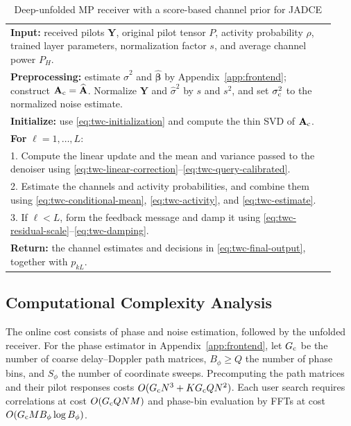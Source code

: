 \begin{table}[t]
\centering
\caption{Deep-unfolded MP receiver with a score-based channel prior for JADCE}
\label{tab:twc-algorithm}
\begin{tabular}{p{0.93\linewidth}}
\toprule
\textbf{Input:} received pilots $\mathbf Y$, original pilot tensor $P$,
activity probability $\rho$, trained layer parameters, normalization
factor $s$, and average channel power $P_H$.\\
\textbf{Preprocessing:} estimate $\widehat\sigma^2$ and
$\widehat{\bm\beta}$ by Appendix~\ref{app:frontend}; construct
$\mathbf A_{\rm c}=\widehat{\mathbf A}$.
Normalize $\mathbf Y$ and $\widehat\sigma^2$ by $s$ and $s^2$,
and set $\sigma_{\rm c}^2$ to the normalized noise estimate.\\
\textbf{Initialize:} use \eqref{eq:twc-initialization} and compute
the thin SVD of $\mathbf A_{\rm c}$.\\
\textbf{For} $\ell=1,\ldots,L$:\\
1. Compute the linear update and the mean and variance passed to the denoiser using
\eqref{eq:twc-linear-correction}--\eqref{eq:twc-query-calibrated}.\\
2. Estimate the channels and activity probabilities, and combine
them using \eqref{eq:twc-conditional-mean}, \eqref{eq:twc-activity},
and \eqref{eq:twc-estimate}.\\
3. If $\ell<L$, form the feedback message and damp it using
\eqref{eq:twc-residual-scale}--\eqref{eq:twc-damping}.\\
\textbf{Return:} the channel estimates and decisions in
\eqref{eq:twc-final-output}, together with $p_{kL}$.\\
\bottomrule
\end{tabular}
\end{table}

\subsection{Computational Complexity Analysis}

The online cost consists of phase and noise estimation, followed by
the unfolded receiver. For the phase estimator in
Appendix~\ref{app:frontend}, let $G_{\rm c}$ be the number of coarse
delay--Doppler path matrices, $B_\phi\geq Q$ the number of phase bins,
and $S_\phi$ the number of coordinate sweeps. Precomputing the path
matrices and their pilot responses costs
$O(G_{\rm c}N^3+KG_{\rm c}QN^2)$.
Each user search requires correlations at cost $O(G_{\rm c}QNM)$
and phase-bin evaluation by FFTs at cost
$O(G_{\rm c}MB_\phi\log B_\phi)$.

